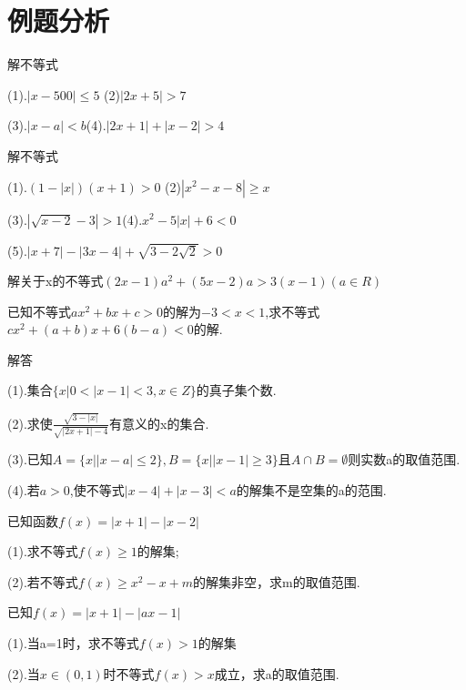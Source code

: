 \section{例题分析}
\begin{example}解不等式\par
	(1).$|x-500|\leq 5$  \hfil   (2)$|2x+5|>7$\par
	\vspace{2cm}
	(3).$|x-a|<b$\hfil  (4).$|2x+1|+|x-2|>4$
	\vspace{2cm}
\end{example}
\begin{example}解不等式\par
	(1).$(1-|x|)(x+1)>0$  \hfil   (2)$|x^2-x-8|\geq x$\par
	\vspace{2cm}
	(3).$|\sqrt{x-2}-3|>1$\hfil  (4).$x^2-5|x|+6<0$\par
	\vspace{2cm}
	(5).$|x+7|-|3x-4|+\sqrt{3-2\sqrt{2}}>0$
	\vspace{2cm}
\end{example}
\begin{example}
	解关于x的不等式$(2x-1)a^2+(5x-2)a>3(x-1)(a\in R)$\\
	\vspace{2cm}
\end{example}
\begin{example}
   已知不等式$ax^2+bx+c>0$的解为$-3<x<1$,求不等式$cx^2+(a+b)x+6(b-a)<0$的解.
   \vspace{2cm}
\end{example}
\begin{example}解答\par
		(1).集合$\{x|0<|x-1|<3,x\in Z\}$的真子集个数.\par
		\vspace{2cm}
	(2).求使$\frac{\sqrt{3-|x|}}{\sqrt{|2x+1|-4}}$有意义的x的集合.\par
	\vspace{2cm}
	(3).已知$A=\{x||x-a|\leq 2\},B=\{x||x-1|\geq 3\}且A\cap B=\emptyset$则实数a的取值范围.\par
	\vspace{2cm}
	(4).若$a>0$,使不等式$|x-4|+|x-3|<a$的解集不是空集的a的范围.
	\vspace{2cm}
\end{example}
\begin{example}
	已知函数$f(x)=|x+1|-|x-2|$\par
	(1).求不等式$f(x)\geq 1$的解集;\par
	(2).若不等式$f(x)\geq x^2-x+m$的解集非空，求m的取值范围.\\
	\vspace{2cm}
	\end{example}
	\begin{example}
		已知$f(x)=|x+1|-|ax-1|$\par
		(1).当a=1时，求不等式$f(x)>1$的解集\par
		(2).当$x\in(0,1)$时不等式$f(x)>x$成立，求a的取值范围.
	\end{example}
	